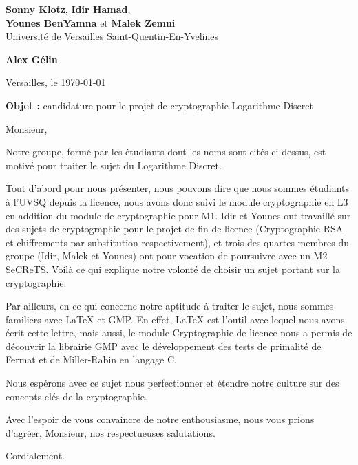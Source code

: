\documentclass[10pt]{letter}
\begin{document}
\sffamily
	
	\begin{flushleft}
		\singlespacing
		\textbf{Sonny Klotz}, \textbf{Idir Hamad},\\ \textbf{Younes BenYamna} et \textbf{Malek Zemni}\\[.35ex]
		\footnotesize
		Université de Versailles Saint-Quentin-En-Yvelines 
	\end{flushleft}
	
	\begin{flushright}
		\singlespacing
		\textbf{Alex Gélin}\\[.35ex]
	\end{flushright}
 
	\begin{flushright}Versailles, le \today\\\end{flushright}

	\vspace{1em}
	
	\textbf{Objet :} candidature pour le projet de cryptographie \guillemotleft Logarithme Discret\guillemotright
	
	Monsieur,
	
	\hspace{1cm} Notre groupe, formé par les étudiants dont les noms sont cités ci-dessus, est motivé pour traiter le sujet du Logarithme Discret.
	
	\hspace{1cm} Tout d'abord pour nous présenter, nous pouvons dire que nous sommes étudiants à l'UVSQ depuis la licence, nous avons donc suivi le module cryptographie en L3 en addition du module de cryptographie pour M1. Idir et Younes ont travaillé sur des sujets de cryptographie pour le projet de fin de licence (Cryptographie RSA et chiffrements par substitution respectivement), et trois des quartes membres du groupe (Idir, Malek et Younes) ont pour vocation de poursuivre avec un M2 SeCReTS. Voilà ce qui explique notre volonté de choisir un sujet portant sur la cryptographie.
	
	\hspace{1cm} Par ailleurs, en ce qui concerne notre aptitude à traiter le sujet, nous sommes familiers avec LaTeX et GMP. En effet, LaTeX est l'outil avec lequel nous avons écrit cette lettre, mais aussi, le module Cryptographie de licence nous a permis de découvrir la librairie GMP avec le développement des tests de primalité de Fermat et de Miller-Rabin en langage C.
	
	\hspace{1cm} Nous espérons avec ce sujet nous perfectionner et étendre notre culture sur des concepts clés de la cryptographie.
	
	\hspace{1cm} Avec l’espoir de vous convaincre de notre enthousiasme, nous vous prions d’agréer, Monsieur, nos respectueuses salutations.
	
	\begin{flushright}
		Cordialement.
	\end{flushright}
\end{document}
